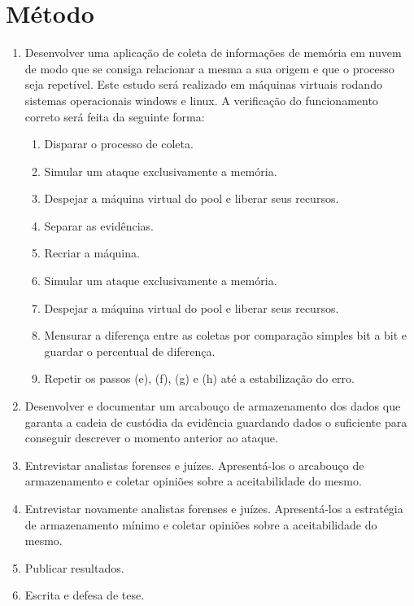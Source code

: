 \documentclass[12pt,				%
	openright,			%
	oneside,			%
	a4paper,			%
	english,			%
	brazil				%
	]{abntex2}
\begin{document}
\chapter{Método} \label{chap:metodo}
\begin{enumerate}
 \item Desenvolver uma aplicação de coleta de informações de memória em nuvem de modo que se consiga relacionar a mesma a sua origem e que
o processo seja repetível. Este estudo será realizado em máquinas virtuais rodando sistemas operacionais windows e linux. A verificação do funcionamento correto será feita 
da seguinte forma:

\begin{enumerate}
 \item Disparar o processo de coleta.
 \item Simular um ataque exclusivamente a memória.
 \item Despejar a máquina virtual do pool e liberar seus recursos.
 \item Separar as evidências.
 \item Recriar a máquina.
 \item Simular um ataque exclusivamente a memória.
 \item Despejar a máquina virtual do pool e liberar seus recursos.
 \item Mensurar a diferença entre as coletas por comparação simples bit a bit e guardar o percentual de diferença.
 \item Repetir os passos (e), (f), (g) e (h) até a estabilização do erro.
\end{enumerate}

\item Desenvolver e documentar um arcabouço de armazenamento dos dados que garanta a cadeia de custódia da evidência guardando dados o suficiente para 
conseguir descrever o momento anterior ao ataque.

\item Entrevistar analistas forenses e juízes. Apresentá-los o arcabouço de armazenamento e coletar opiniões sobre a aceitabilidade do mesmo.

\item Entrevistar novamente analistas forenses e juízes. Apresentá-los a estratégia de armazenamento mínimo e coletar opiniões sobre a aceitabilidade do mesmo. 

\item Publicar resultados.

\item Escrita e defesa de tese.

\end{enumerate}
\end{document}
